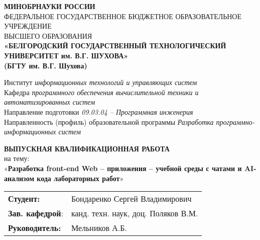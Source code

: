 
\newcommand{\No}{\textnumero}









\begin{titlepage}
    \centering
    {\small \textbf{МИНОБРНАУКИ РОССИИ}}\\
    {\small ФЕДЕРАЛЬНОЕ ГОСУДАРСТВЕННОЕ БЮДЖЕТНОЕ ОБРАЗОВАТЕЛЬНОЕ УЧРЕЖДЕНИЕ}\\
    {\small ВЫСШЕГО ОБРАЗОВАНИЯ}\\
    \textbf{
    «БЕЛГОРОДСКИЙ ГОСУДАРСТВЕННЫЙ ТЕХНОЛОГИЧЕСКИЙ \\
    УНИВЕРСИТЕТ им. В.Г. ШУХОВА» \\
    (БГТУ им. В.Г. Шухова) \\
    }
    
    \vfill %
    
    \raggedright
    Институт \textit{информационных технологий и управляющих систем}\\
    Кафедра \textit{программного обеспечения вычислительной техники и автоматизированных систем}\\
    Направление подготовки \textit{09.03.04 – Программная инженерия}\\
    Направленность (профиль) образовательной программы \textit{Разработка программно-информационных систем}
    
    \centering
    \vfill
    
    \textbf{ВЫПУСКНАЯ КВАЛИФИКАЦИОННАЯ РАБОТА}\\
    {\large на тему:\\[1ex]
    «\textbf{Разработка front-end Web – приложения – учебной среды с чатами и AI-анализом кода лабораторных работ}»}
    
    \vfill %
    
    \raggedright
    \begin{tabular}{@{} l l @{}}
        \textbf{Студент:}       & Бондаренко Сергей Владимирович \\
        \textbf{Зав. кафедрой}: & канд. техн. наук, доц. Поляков В.М. \\
        \textbf{Руководитель:}  & Мельников А.Б.
    \end{tabular}
    

\end{titlepage}
